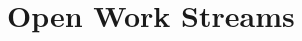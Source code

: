 \chapter{Open Work Streams}\label{chpt:3:open_work_streams}
\label{chpt:3:sec:0:octrees}
\label{chpt:3:sec:1:m2l}
